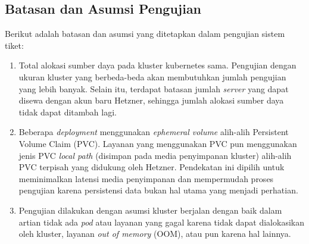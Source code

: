 \subsection{Batasan dan Asumsi Pengujian}

Berikut adalah batasan dan asumsi yang ditetapkan dalam pengujian sistem tiket:

\begin{enumerate}
  \item Total alokasi sumber daya pada kluster kubernetes sama. Pengujian dengan ukuran kluster yang berbeda-beda akan membutuhkan jumlah pengujian yang lebih banyak. Selain itu, terdapat batasan jumlah \textit{server} yang dapat disewa dengan akun baru Hetzner, sehingga jumlah alokasi sumber daya tidak dapat ditambah lagi.
  \item Beberapa \textit{deployment} menggunakan \textit{ephemeral volume} alih-alih Persistent Volume Claim (PVC). Layanan yang menggunakan PVC pun menggunakan jenis PVC \textit{local path} (disimpan pada media penyimpanan kluster) alih-alih PVC terpisah yang didukung oleh Hetzner. Pendekatan ini dipilih untuk meminimalkan latensi media penyimpanan dan mempermudah proses pengujian karena persistensi data bukan hal utama yang menjadi perhatian.
  \item Pengujian dilakukan dengan asumsi kluster berjalan dengan baik dalam artian tidak ada \textit{pod} atau layanan yang gagal karena tidak dapat dialokasikan oleh kluster, layanan \textit{out of memory} (OOM), atau pun karena hal lainnya.
\end{enumerate}

